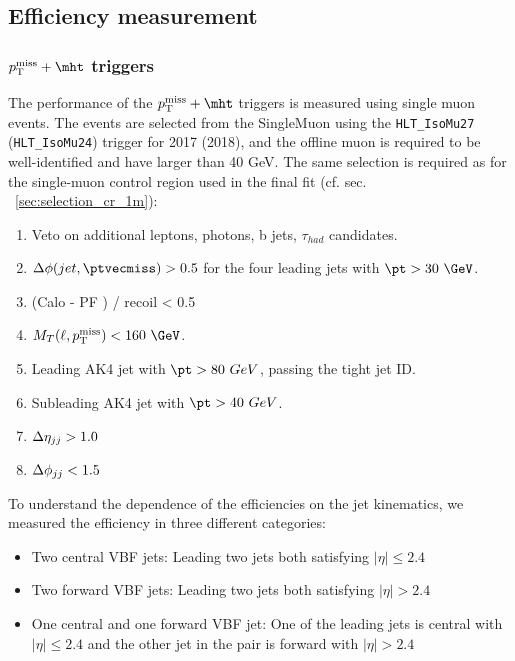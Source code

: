 \subsection{Efficiency measurement}
\label{sec:efficiency}

\subsubsection{$\ptmiss+\mht$ triggers}
The performance of the $\ptmiss+\mht$ triggers is measured using single muon events. The
events are selected from the SingleMuon using the \texttt{HLT\_IsoMu27} (\texttt{HLT\_IsoMu24}) 
trigger for 2017 (2018), and the offline muon is required to be well-identified and have \pt larger than 40 GeV. 
The same selection is required as for the single-muon control region used in the final fit (cf. sec. ~\ref{sec:selection_cr_1m}):

\begin{enumerate}
    \item Veto on additional leptons, photons, b jets, $\tau_{had}$ candidates.
    \item $\Delta\phi(jet,\ptvecmiss)>0.5$ for the four leading jets with $\pt>30~\GeV$.
    \item (Calo \ptmiss - PF \ptmiss) / recoil < 0.5
    \item $M_{T}(\ell,\ptmiss) < 160~\GeV$.
    \item Leading AK4 jet with $\pt>80\ GeV$, passing the tight jet ID.
    \item Subleading AK4 jet with $\pt>40\ GeV$.
    \item $\Delta \eta_{jj} > 1.0$
    \item $\Delta \phi_{jj} < 1.5$
\end{enumerate}

To understand the dependence of the efficiencies on the jet kinematics, we measured the efficiency in three different categories:

\begin{itemize}
    \item Two central VBF jets: Leading two jets both satisfying $|\eta| \leq 2.4$
    \item Two forward VBF jets: Leading two jets both satisfying $|\eta| > 2.4$
    \item One central and one forward VBF jet: One of the leading jets is central with $|\eta| \leq 2.4$ and the other jet in the pair is forward 
    with $|\eta| > 2.4$
\end{itemize}

